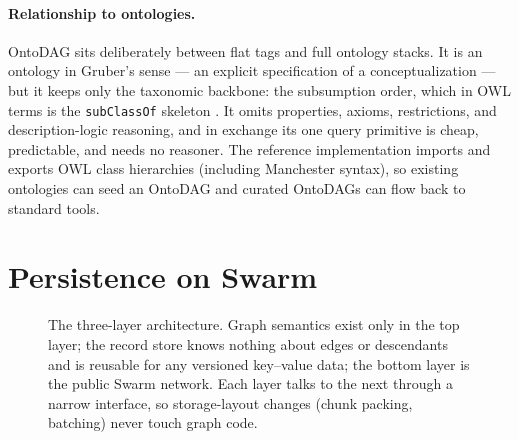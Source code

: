 \documentclass[10pt,twocolumn]{article}
\begin{document}
\paragraph{Relationship to ontologies.}
OntoDAG sits deliberately between flat tags and full ontology stacks. It
is an ontology in Gruber's sense --- an explicit specification of a
conceptualization \cite{gruber1993} --- but it keeps only the taxonomic
backbone: the subsumption order, which in OWL terms is the
\texttt{subClassOf} skeleton \cite{owl2}. It omits properties, axioms,
restrictions, and description-logic reasoning, and in exchange its one
query primitive is cheap, predictable, and needs no reasoner. The
reference implementation imports and exports OWL class hierarchies
(including Manchester syntax), so existing ontologies can seed an OntoDAG
and curated OntoDAGs can flow back to standard tools.

\section{Persistence on Swarm}
\label{sec:swarm}

\begin{figure}[t]
\centering
{}
\caption{The three-layer architecture. Graph semantics exist only in the
top layer; the record store knows nothing about edges or descendants and
is reusable for any versioned key--value data; the bottom layer is the
public Swarm network. Each layer talks to the next through a narrow
interface, so storage-layout changes (chunk packing, batching) never
touch graph code.}
\label{fig:stack}
\end{figure}
\end{document}
